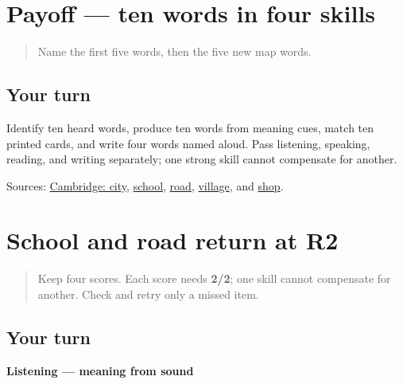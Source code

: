 \section[\texorpdfstring{\gu{બજાર} — \gu{ઘર} — \gu{મંદિર} … (bajār — ghar …)}{બજાર — ઘર — મંદિર … (bajār — ghar …)}]{Payoff — ten words in four skills}

\label{lesson:GU-C23-map-ten}



\begin{quote}
Name the first five words, then the five new map words.
\end{quote}

\subsection*{Your turn}
Identify ten heard words, produce ten words from meaning cues, match ten printed cards, and write four words named aloud. Pass listening, speaking, reading, and writing separately; one strong skill cannot compensate for another.

\begin{tcolorbox}[breakable,colback=teal!4,colframe=teal!35!black,title={Before you move on}]
Sources: \href{https://dictionary.cambridge.org/dictionary/english-gujarati/city}{Cambridge: city}, \href{https://dictionary.cambridge.org/dictionary/english-gujarati/school}{school}, \href{https://dictionary.cambridge.org/dictionary/english-gujarati/road}{road}, \href{https://dictionary.cambridge.org/dictionary/english-gujarati/village}{village}, and \href{https://dictionary.cambridge.org/dictionary/english-gujarati/shop}{shop}.
\end{tcolorbox}
\section[\texorpdfstring{\gu{શાળા} — \gu{રસ્તો} (shāḷā — rasto)}{શાળા — રસ્તો (shāḷā — rasto)}]{School and road return at R2}

\label{lesson:GU-R23-shaalaa-rasto-r2}



\begin{quote}
Keep four scores. Each score needs \textbf{2/2}; one skill cannot compensate for another. Check and retry only a missed item.
\end{quote}

\subsection*{Your turn}
\textbf{Listening — meaning from sound}

